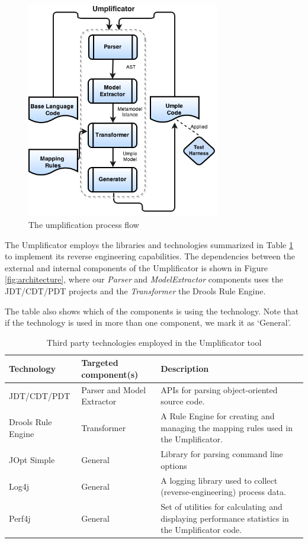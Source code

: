 \begin{figure}[!t]
\centering
\includegraphics[width=0.75\textwidth]{Figures/Umplificator_ProcessFlow.png} 
\caption{The umplification process flow}
\label{fig:process_flow}
\end{figure}

The Umplificator employs the libraries and technologies summarized in Table \ref{table:technologies} to implement its reverse engineering capabilities. The dependencies between the external and internal components of the Umplificator is shown in Figure \ref{fig:architecture}, where our \textit{Parser} and \textit{ModelExtractor} components uses the JDT/CDT/PDT projects and the \textit{Transformer} the Drools Rule Engine. 

The table also shows which of the components is using the technology. Note that if the technology is used in more than one component, we mark it as `General'.

\begin{table}[h]
\caption{Third party technologies employed in the Umplificator tool}
\label{table:technologies}
\begin{tabular}{l|l|p{6cm}}
\toprule
\rowcolor[HTML]{BBDAFF}
\textbf{Technology} & \textbf{Targeted component(s)}  & \textbf{Description}  \\ \midrule
JDT/CDT/PDT  & Parser and Model Extractor & APIs for parsing object-oriented source code.\\ \hline 
Drools Rule Engine & Transformer  & A Rule Engine for creating and managing the mapping rules used in the Umplificator.	 \\ \hline	
JOpt Simple & General  & Library for parsing command line options \\ \hline	
Log4j & General & A logging library used to collect (reverse-engineering) process data.	\\ \hline	
Perf4j & General & Set of utilities for calculating and displaying performance statistics in the Umplificator code. \\ \bottomrule
\end{tabular}
\end{table}

